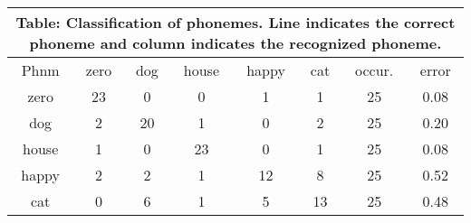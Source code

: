 \documentclass[10pt]{article}
\begin{document}
\tiny
\begin{tabular}{|@{}c@{}||@{}c@{}|@{}c@{}|@{}c@{}|@{}c@{}|@{}c@{}|@{}c@{}|@{}c@{}|}
\hline
\multicolumn{8}{c}{Table: Classification of phonemes. Line indicates the correct phoneme and column indicates the recognized phoneme.} \\ \hline \hline
Phnm & zero & dog & house & happy & cat & occur. & error \\ \hline
zero & 23 & 0 & 0 & 1 & 1 & 25 & 0.08 \\ \hline
dog & 2 & 20 & 1 & 0 & 2 & 25 & 0.20 \\ \hline
house & 1 & 0 & 23 & 0 & 1 & 25 & 0.08 \\ \hline
happy & 2 & 2 & 1 & 12 & 8 & 25 & 0.52 \\ \hline
cat & 0 & 6 & 1 & 5 & 13 & 25 & 0.48 \\ \hline
\end{tabular}
\end{document}
